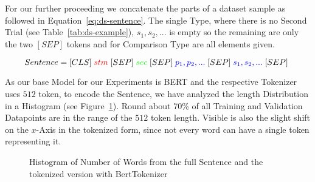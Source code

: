 \newpage


For our further proceeding we concatenate the parts of a dataset sample as followed in Equation~\ref{eq:ds-sentence}.
The single Type, where there is no Second Trial (see Table~\ref{tab:ds-example}), $s_1, s_2, ... $
is empty so the remaining are only the two $[SEP]$ tokens and for Comparison Type are all elements given.

\begin{equation}\label{eq:ds-sentence}
\resizebox{0.91\hsize}{!}{%
 $Sentence = [CLS] \; \textcolor{red}{stm}\;
             [SEP] \; \textcolor{green}{sec}\;
             [SEP] \; \textcolor{blue}{p_1, p_2, ... }\;
             [SEP] \; \textcolor{blue}{s_1, s_2, ... }\;
             [SEP]$      
}
\end{equation}

As our base Model for our Experiments is BERT and the respective Tokenizer uses $512$ token, to encode the Sentence, 
we have analyzed the length Distribution in a Histogram (see Figure~\ref{cap:hist}). 
Round about 70\% of all Training and Validation Datapoints are in the range of the $512$ token length. 
Visible is also the slight shift on the $x$-Axis in the tokenized form, since not every word can have a single token
representing it.

\begin{figure}[!htb]
    \hspace*{-4.5cm}
    \centering
    
    \caption{Histogram of Number of Words from the full Sentence and the tokenized version with BertTokenizer}\label{cap:hist}
\end{figure}